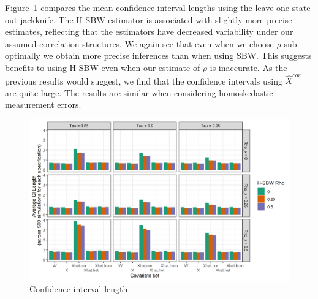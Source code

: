 Figure~\ref{fig:simcoverage2} compares the mean confidence interval lengths using the leave-one-state-out jackknife. The H-SBW estimator is associated with slightly more precise estimates, reflecting that the estimators have decreased variability under our assumed correlation structures. We again see that even when we choose $\rho$ sub-optimally we obtain more precise inferences than when using SBW. This suggests benefits to using H-SBW even when our estimate of $\rho$ is inaccurate. As the previous results would suggest, we find that the confidence intervals using $\hat{X}^{cor}$ are quite large. The results are similar when considering homoskedastic measurement errors. 

\begin{figure}[H]
\begin{center}
    \caption{Confidence interval length}\label{fig:simcoverage2}
    \includegraphics[scale=0.5]{01_Plots/ci-length-plot.png}
\end{center}
\end{figure}

